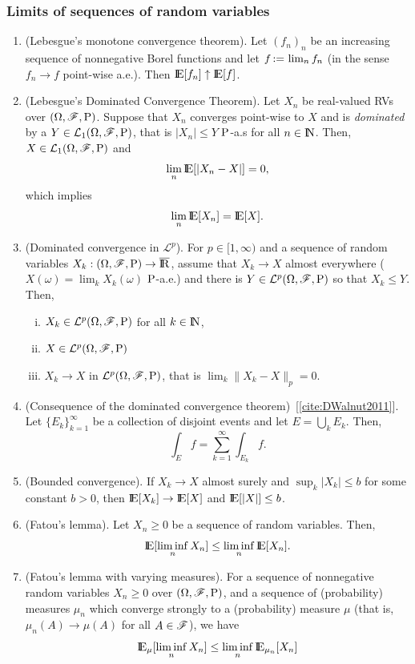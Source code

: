 \documentclass[a4paper,10pt]{article}
\begin{document}
\subsubsection{Limits of sequences of random variables}
\begin{enumerate}
 \item (Lebesgue's monotone convergence theorem). Let $(f_n)_n$ be an increasing sequence of 
       nonnegative Borel functions and let $f {}\mathop{\mathrel{:}=}{} \lim_n f_n$ (in the sense $f_n\to f$ point-wise a.e.). 
       Then $\E[f_n] \uparrow \E[f]$.
      
 \item 	(Lebesgue's Dominated Convergence Theorem). Let $X_n$ be real-valued RVs over $(\Omega,\mathscr{F},\mathrm{P})$. 
	Suppose that $X_n$ converges point-wise to $X$ and is \textit{dominated} by a 
	$Y\in\mathcal{L}_1(\Omega,\mathscr{F},\mathrm{P})$, that is $|X_n|\leq Y$ $\mathrm{P}$-a.s for all $n\in\N$. 
	Then, $X\in\mathcal{L}_1(\Omega,\mathscr{F},\mathrm{P})$
	and
	\[
	 \lim_n \E[|X_n-X|] = 0,
	\]
        which implies
        \[
         \lim_n \E[X_n] = \E[X].
        \]

 \item (Dominated convergence in $\mathcal{L}^p$).
       For $p\in[1,\infty)$ and a sequence of random variables $X_k:\ofp\to\barre$,
       assume that $X_k\to X$ almost everywhere ($X(\omega)=\lim_k X_k(\omega)$ $\mathrm{P}$-a.e.)
       and there is $Y\in\mathcal{L}^p(\Omega,\mathscr{F},\mathrm{P})$ so that $X_k\leq Y$. Then, 
       \begin{enumerate}[i.]
        \item $X_k\in\mathcal{L}^p(\Omega,\mathscr{F},\mathrm{P})$ for all $k\in\N$,
        \item $X\in\mathcal{L}^p(\Omega,\mathscr{F},\mathrm{P})$ 
        \item $X_k\to X$ in $\mathcal{L}^p(\Omega,\mathscr{F},\mathrm{P})$, that is $\lim_k \|X_k-X\|_p = 0$.
       \end{enumerate}

 \item (Consequence of the dominated convergence theorem)~[\ref{cite:DWalnut2011}]. 
       Let $\{E_k\}_{k=1}^{\infty}$ be a collection of disjoint events and let $E=\bigcup_{k}E_k$.
       Then,
       \[
        \int_E f = \sum_{k=1}^{\infty} \int_{E_k} f.
       \]

 \item  (Bounded convergence). If $X_k \to X$ almost surely and $\sup_k |X_k| \leq b$
        for some constant $b>0$, then $\E[X_k]\to \E[X]$ and $\E[|X|] \leq b$.
       
 \item 	(Fatou's lemma). Let $X_n\geq 0$ be a sequence of random variables. 
	Then, 
	\[
	\E[\liminf_n X_n] \leq  \liminf_n \E[X_n].
	\]
 \item 	(Fatou's lemma with varying measures). For a sequence of nonnegative random variables $X_n\geq 0$ over $(\Omega,\mathscr{F},\mathrm{P})$,
	and a sequence of (probability) measures $\mu_n$ which converge strongly to a (probability)
	measure $\mu$ (that is, $\mu_n(A)\to\mu(A)$ for all $A\in\mathscr{F}$), we have
	\[
	 \E_\mu[\liminf_n X_n]\leq \liminf_n \E_{\mu_n}[ X_n]
	\]


\end{enumerate}
\end{document}
